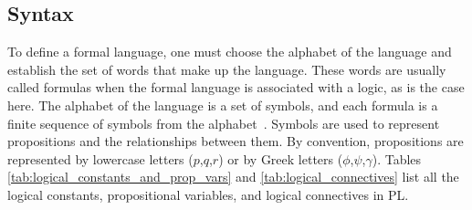 \subsection{Syntax}
\label{chap:prop-syntax}
To define a formal language, one must choose the alphabet of the language and establish the set of words that make up the language. These words are usually called formulas when the formal language is associated with a logic, as is the case here. The alphabet of the language is a set of symbols, and each formula is a finite sequence of symbols from the alphabet~\cite{gouveia_lgica}. Symbols are used to represent propositions and the relationships between them. By convention, propositions are represented by lowercase letters (\(p\),\(q\),\(r\)) or by Greek letters (\(\phi\),\(\psi\),\(\gamma\)). Tables \ref{tab:logical_constants_and_prop_vars} and \ref{tab:logical_connectives} list all the logical constants, propositional variables, and logical connectives in \gls{PL}. 

\begin{table}[h!]
    \centering
    \caption{Logical Constants and Propositional Variables}
    \label{tab:logical_constants_and_prop_vars}
\end{table}

\begin{table}[h!]
    \centering
    \caption{Logical Connectives}
    \label{tab:logical_connectives}
\end{table}

